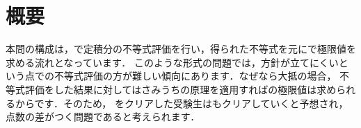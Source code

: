 \documentclass[../../../doc/main]{subfiles}
\begin{document}
    \setcounter{chapter}{1}
    \setcounter{section}{0}
    \section{概要}\label{概要1}
        本問の構成は，\kakkoichi で定積分の不等式評価を行い，得られた不等式を元に\kakkoni で極限値を求める流れとなっています．
        このような形式の問題では，方針が立てにくいという点で\kakkoichi の不等式評価の方が難しい傾向にあります．なぜなら大抵の場合，
        不等式評価をした結果に対してはさみうちの原理を適用すれば\kakkoni の極限値は求められるからです．そのため，\kakkoichi 
        をクリアした受験生は\kakkoni もクリアしていくと予想され，点数の差がつく問題であると考えられます．
\end{document}
